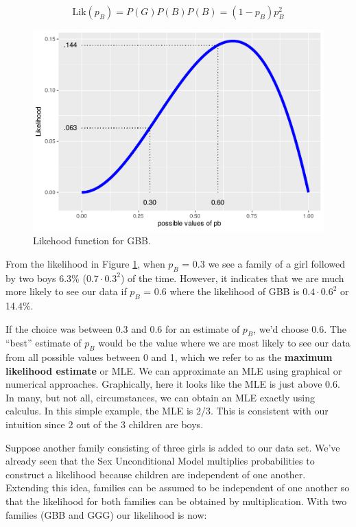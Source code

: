 \documentclass[
]{krantz}
\newcommand{\lik}{\mathrm{Lik}}
\begin{document}
\begin{equation*}
 \lik (p_B) = P(G)P(B)P(B) = (1-p_B)p_B^2
\end{equation*}

\begin{figure}

{\centering \includegraphics[width=0.9\linewidth]{bookdown-BeyondMLR_files/figure-latex/lik1-1} 

}

\caption{Likehood function for GBB.}\label{fig:lik1}
\end{figure}

From the likelihood in Figure \ref{fig:lik1}, when \(p_B\) = 0.3 we see a family of a girl followed by two boys 6.3\% (\(0.7\cdot0.3^2\)) of the time. However, it indicates that we are much more likely to see our data if \(p_B\) = 0.6 where the likelihood of GBB is \(0.4\cdot0.6^2\) or 14.4\%.

If the choice was between 0.3 and 0.6 for an estimate of \(p_B\), we'd choose 0.6. The ``best'' estimate of \(p_B\) would be the value where we are most likely to see our data from all possible values between 0 and 1, which we refer to as the \textbf{maximum likelihood estimate} or MLE.  We can approximate an MLE using graphical or numerical approaches. Graphically, here it looks like the MLE is just above 0.6. In many, but not all, circumstances, we can obtain an MLE exactly using calculus. In this simple example, the MLE is 2/3. This is consistent with our intuition since 2 out of the 3 children are boys.

Suppose another family consisting of three girls is added to our data set. We've already seen that the Sex Unconditional Model multiplies probabilities to construct a likelihood because children are independent of one another. Extending this idea, families can be assumed to be independent of one another so that the likelihood for both families can be obtained by multiplication. With two families (GBB and GGG) our likelihood is now:
\end{document}
